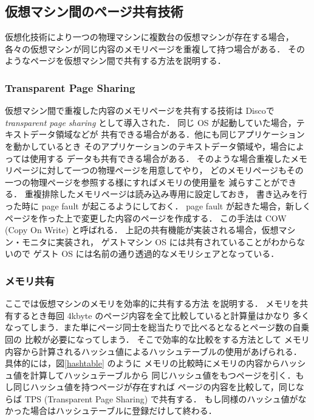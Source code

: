 \documentclass[graduation-thesis]{mlarticle}
\begin{document}
\subsection{仮想マシン間のページ共有技術}
\label{sec-2-4}
仮想化技術により一つの物理マシンに複数台の仮想マシンが存在する場合，
各々の仮想マシンが同じ内容のメモリページを重複して持つ場合がある．
そのようなページを仮想マシン間で共有する方法を説明する．
\subsubsection{Transparent Page Sharing}
\label{sec-2-4-1}
\label{tps}
仮想マシン間で重複した内容のメモリページを共有する技術は
Disco\cite{Bugnion:1997:DRC}で 
{\it transparent page sharing}
として導入された．
同じ OS が起動していた場合，テキストデータ領域などが
共有できる場合がある．他にも同じアプリケーションを動かしているとき
そのアプリケーションのテキストデータ領域や，場合によっては使用する
データも共有できる場合がある．
そのような場合重複したメモリページに対して一つの物理ページを用意してやり，
どのメモリページもその一つの物理ページを参照する様にすればメモリの使用量を
減らすことができる．
重複排除したメモリページは読み込み専用に設定しておき，
書き込みを行った時に page fault が起こるようにしておく．
page fault が起きた場合，新しくページを作った上で変更した内容のページを作成する．
この手法は COW (Copy On Write) と呼ばれる．
上記の共有機能が実装される場合，仮想マシン・モニタに実装され，
ゲストマシン OS には共有されていることがわからないので
ゲスト OS には名前の通り透過的なメモリシェアとなっている．

\subsubsection{メモリ共有}
\label{sec-2-4-2}
\label{memory_share}
ここでは仮想マシンのメモリを効率的に共有する方法 \cite{Waldspurger:2002:MRM} を説明する．
メモリを共有するとき毎回 4kbyte のページ内容を全て比較していると計算量はかなり
多くなってしまう．また単にページ同士を総当たりで比べるとなるとページ数の自乗回の
比較が必要になってしまう．
そこで効率的な比較をする方法として
メモリ内容から計算されるハッシュ値によるハッシュテーブルの使用があげられる．\cite{Val:2003:AAC}
具体的には，図\ref{hashtable} のように
メモリの比較時にメモリの内容からハッシュ値を計算してハッシュテーブルから
同じハッシュ値をもつページを引く．もし同じハッシュ値を持つページが存在すれば
ページの内容を比較して，同じならば TPS (Transparent Page Sharing) で共有する．
もし同様のハッシュ値がなかった場合はハッシュテーブルに登録だけして終わる．
\end{document}
